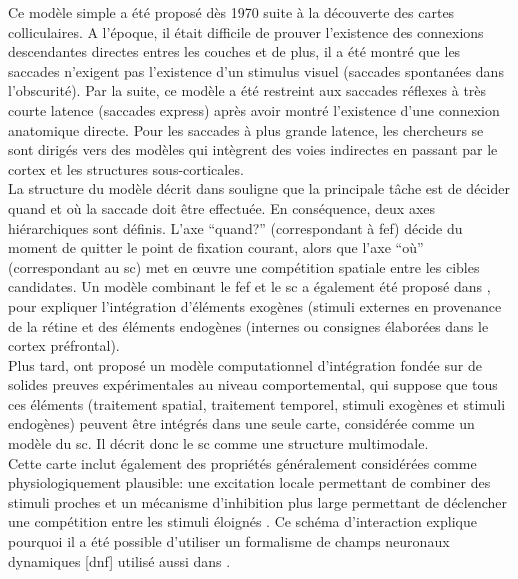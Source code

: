 Ce modèle simple a été proposé dès 1970 suite à la découverte des cartes colliculaires. A l'époque, il était difficile de prouver l'existence des connexions descendantes directes entres les couches et de plus, il a été montré que les saccades n'exigent pas l'existence d'un stimulus visuel (saccades spontanées dans l'obscurité). Par la suite, ce modèle a été restreint aux saccades réflexes à très courte latence (saccades express) après avoir montré l'existence d'une connexion anatomique directe. Pour les saccades à plus grande latence, les chercheurs se sont dirigés vers des modèles qui intègrent des voies indirectes en passant par le cortex et les structures sous-corticales\cite{Wurtz:1996,Purves:2005}.\\ 

La structure du modèle décrit dans \cite {Findlay:1999} souligne que la principale tâche est de décider quand et où la saccade doit être effectuée. En conséquence, deux axes hiérarchiques sont définis. L'axe ``quand?'' (correspondant à \gls{fef}) décide du moment de quitter le point de fixation courant, alors que l'axe ``o\`u'' (correspondant au \gls{sc}) met en œuvre une compétition spatiale entre les cibles candidates. Un modèle combinant le \gls{fef} et le \gls{sc} a également été proposé dans \cite {Kramer:1999}, pour expliquer l'intégration d'éléments exogènes (stimuli externes en provenance de la rétine et des éléments endogènes (internes ou consignes élaborées dans le cortex préfrontal). \\

Plus tard, \cite {Godijn:2002} ont proposé un modèle computationnel d'intégration fondée sur de solides preuves expérimentales au niveau comportemental, qui suppose que tous ces éléments (traitement spatial, traitement temporel, stimuli exogènes et stimuli endogènes) peuvent être intégrés dans une seule carte, considérée comme un modèle du \gls{sc}. Il décrit donc le \gls{sc} comme une structure multimodale.\\

Cette carte inclut également des propriétés généralement considérées comme physiologiquement plausible: une excitation locale permettant de combiner des stimuli proches et un mécanisme d'inhibition plus large permettant de déclencher une compétition entre les stimuli éloignés \cite {VanOpstal:1989, Tweed:1990, Munoz:1998}. Ce schéma d'interaction explique pourquoi il a été possible d'utiliser un formalisme de champs neuronaux dynamiques [\gls{dnf}] \cite {Amari:1977} utilisé aussi dans \cite {Trappenberg:2001, Schneider:2002, Badler:2002,Marino:2012}. \\


